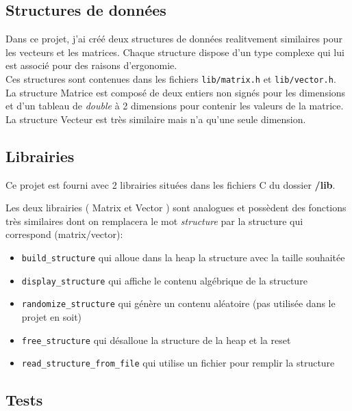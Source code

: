 \documentclass[11pt, a4paper]{article}
\begin{document}
\subsection{Structures de données}

Dans ce projet, j'ai créé deux structures de données realitvement similaires pour les vecteurs et les matrices. Chaque structure dispose d'un type complexe qui lui est associé pour des raisons d'ergonomie.\\

Ces structures sont contenues dans les fichiers \texttt{lib/matrix.h} et \texttt{lib/vector.h}.\\

La structure Matrice est composé de deux entiers non signés pour les dimensions et d'un tableau de \textit{double} à 2 dimensions pour contenir les valeurs de la matrice.\\

La structure Vecteur est très similaire mais n'a qu'une seule dimension.\\

\subsection{Librairies}

Ce projet est fourni avec 2 librairies situées dans les fichiers C du dossier \textbf{/lib}.

Les deux librairies ( Matrix et Vector ) sont analogues et possèdent des fonctions très similaires dont on remplacera le mot \textit{structure} par la structure qui correspond (matrix/vector):

\begin{itemize}
    \item \texttt{build\_structure} qui alloue dans la heap la structure avec la taille souhaitée
    \item \texttt{display\_structure} qui affiche le contenu algébrique de la structure
    \item \texttt{randomize\_structure} qui génère un contenu aléatoire (pas utilisée dans le projet en soit)
    \item \texttt{free\_structure} qui désalloue la structure de la heap et la reset
    \item \texttt{read\_structure\_from\_file} qui utilise un fichier pour remplir la structure
\end{itemize}

\newpage

\subsection{Tests}
\end{document}
